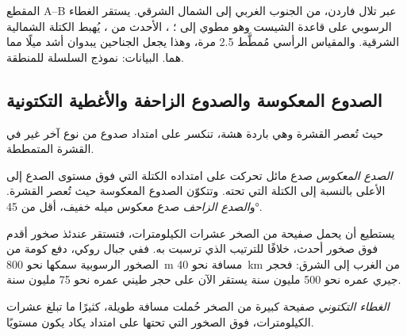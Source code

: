 \begin{omfigure}
{\small المقطع A--B عبر تلال فاردن، من الجنوب الغربي إلى
الشمال الشرقي. يستقر الغطاء الرسوبي على قاعدة الشيست وهو مطوي إلى
 ؛ ، الأحدث من ، يُهبط
الكتلة الشمالية الشرقية. والمقياس الرأسي مُمطَّط 2.5 مرة، وهذا
يجعل الجناحين يبدوان أشد ميلًا مما هما. البيانات: نموذج السلسلة
للمنطقة.}
\end{omfigure}

\subsection{الصدوع المعكوسة والصدوع الزاحفة والأغطية التكتونية}

حيث تُعصر القشرة وهي باردة هشة، تنكسر على امتداد صدوع
من نوع آخر غير  في القشرة المتمططة.

\begin{definition}\label{def:g12:mountain-building:thrust}
\emph{الصدع المعكوس} صدع مائل تحركت على امتداده
الكتلة التي فوق مستوى الصدع إلى الأعلى بالنسبة إلى الكتلة التي
تحته. وتتكوّن الصدوع المعكوسة حيث تُعصر القشرة.
و\emph{الصدع الزاحف} صدع معكوس ميله خفيف، أقل من
\ang{45}.
\end{definition}

يستطيع  أن يحمل صفيحة من الصخر عشرات الكيلومترات، فتستقر عندئذ صخور
أقدم فوق صخور أحدث، خلافًا للترتيب الذي
ترسبت به. ففي جبال روكي، دفع 
كومة من الصخور الرسوبية سمكها نحو \qty{800}{m} مسافة نحو \qty{40}{km} من
الغرب إلى الشرق: فحجر جيري عمره نحو 500 مليون سنة يستقر الآن على حجر طيني
عمره نحو 75 مليون سنة.

\begin{definition}\label{def:g12:mountain-building:nappe}
\emph{الغطاء التكتوني} صفيحة كبيرة من الصخر حُملت
مسافة طويلة، كثيرًا ما تبلغ عشرات الكيلومترات، فوق الصخور التي تحتها على امتداد
 يكاد يكون مستويًا.
\end{definition}

